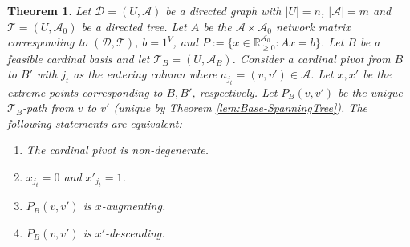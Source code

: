 \documentclass[11pt]{article}
\newcommand{\R}{\mathbb{R}}
\newtheorem{theorem}{Theorem}
\begin{document}
\begin{theorem}\label{lem:Nonde-Pivot}
Let $\mathcal{D}=(U,\mathcal{A})$ be a directed graph with $|U|=n$, $|\mathcal{A}|=m$ and $\mathcal{T}=(U,\mathcal{A}_0)$ be a directed tree. Let $A$ be the $\mathcal{A}\times \mathcal{A}_0$ network matrix corresponding to $(\mathcal{D},\mathcal{T})$, $b=1^V$, and $P:=\{x\in \R^{\mathcal{A}_0}_{\ge 0}: Ax=b \}$. 
Let $B$ be a feasible cardinal basis and let $\mathcal{T}_B=(U,\mathcal{A}_B)$. 
Consider a cardinal pivot from $B$ to $B'$ with $j_t$ as the entering column where $a_{j_t}=(v,v')\in\mathcal{A}$. Let $x,x'$ be the extreme points corresponding to $B,B'$, respectively. Let $P_B(v,v')$ be the unique $\mathcal{T}_B$-path from $v$ to $v'$ (unique by Theorem \ref{lem:Base-SpanningTree}). The following statements are equivalent:

    \begin{enumerate}
        \item[(i)] The cardinal pivot is non-degenerate.
        \item[(ii)] $x_{j_t}=0$ and $x'_{j_t}=1$.
        \item[(iii)] $P_B(v,v')$ is $x$-augmenting.
        
\item[(iv)] $P_B(v,v')$ is $x'$-descending.
    \end{enumerate}

\end{theorem}
\end{document}
